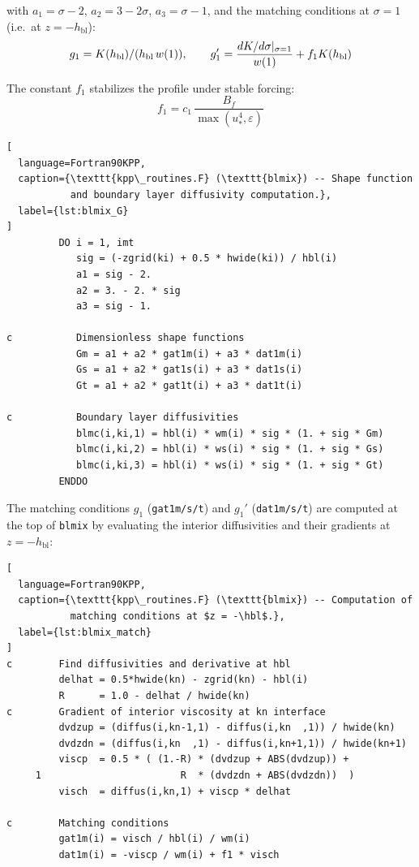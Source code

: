 \documentclass[12pt,letterpaper]{article}
\newcommand{\hbl}{h_{\mathrm{bl}}}
\newcommand{\ustar}{u_*}
\begin{document}
with $a_1 = \sigma - 2$, $a_2 = 3 - 2\sigma$, $a_3 = \sigma - 1$,  
and the matching conditions at $\sigma = 1$ (i.e.\ at $z = -\hbl$):  
\begin{equation}  
g_1 = K(\hbl)/(h_{\rm bl}\,w(1)),  
\qquad  
g_1' = \frac{dK/d\sigma|_{\sigma=1}}{w(1)} + f_1 K(\hbl)  
\end{equation}  
  
The constant $f_1$ stabilizes the profile under stable forcing:  
\begin{equation}  
f_1 = c_1\,\frac{B_f}{\max(\ustar^4, \varepsilon)}  
\end{equation}  
  
\begin{lstlisting}[  
  language=Fortran90KPP,  
  caption={\texttt{kpp\_routines.F} (\texttt{blmix}) -- Shape function  
           and boundary layer diffusivity computation.},  
  label={lst:blmix_G}  
]  
         DO i = 1, imt  
            sig = (-zgrid(ki) + 0.5 * hwide(ki)) / hbl(i)  
            a1 = sig - 2.  
            a2 = 3. - 2. * sig  
            a3 = sig - 1.  
  
c           Dimensionless shape functions  
            Gm = a1 + a2 * gat1m(i) + a3 * dat1m(i)  
            Gs = a1 + a2 * gat1s(i) + a3 * dat1s(i)  
            Gt = a1 + a2 * gat1t(i) + a3 * dat1t(i)  
  
c           Boundary layer diffusivities  
            blmc(i,ki,1) = hbl(i) * wm(i) * sig * (1. + sig * Gm)  
            blmc(i,ki,2) = hbl(i) * ws(i) * sig * (1. + sig * Gs)  
            blmc(i,ki,3) = hbl(i) * ws(i) * sig * (1. + sig * Gt)  
         ENDDO  
\end{lstlisting}  
  
The matching conditions $g_1$ (\texttt{gat1m/s/t}) and $g_1'$  
(\texttt{dat1m/s/t}) are computed at the top of \texttt{blmix} by  
evaluating the interior diffusivities and their gradients at $z = -\hbl$:  
  
\begin{lstlisting}[  
  language=Fortran90KPP,  
  caption={\texttt{kpp\_routines.F} (\texttt{blmix}) -- Computation of  
           matching conditions at $z = -\hbl$.},  
  label={lst:blmix_match}  
]  
c        Find diffusivities and derivative at hbl  
         delhat = 0.5*hwide(kn) - zgrid(kn) - hbl(i)  
         R      = 1.0 - delhat / hwide(kn)  
c        Gradient of interior viscosity at kn interface  
         dvdzup = (diffus(i,kn-1,1) - diffus(i,kn  ,1)) / hwide(kn)  
         dvdzdn = (diffus(i,kn  ,1) - diffus(i,kn+1,1)) / hwide(kn+1)  
         viscp  = 0.5 * ( (1.-R) * (dvdzup + ABS(dvdzup)) +  
     1                        R  * (dvdzdn + ABS(dvdzdn))  )  
         visch  = diffus(i,kn,1) + viscp * delhat  
  
c        Matching conditions  
         gat1m(i) = visch / hbl(i) / wm(i)  
         dat1m(i) = -viscp / wm(i) + f1 * visch  
\end{lstlisting}  
  
\end{document}
